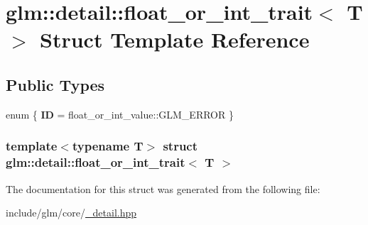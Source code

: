 \hypertarget{structglm_1_1detail_1_1float__or__int__trait}{\section{glm\-:\-:detail\-:\-:float\-\_\-or\-\_\-int\-\_\-trait$<$ \-T $>$ \-Struct \-Template \-Reference}
\label{structglm_1_1detail_1_1float__or__int__trait}
}
\subsection*{\-Public \-Types}
\begin{DoxyCompactItemize}
\item 
enum \{ {\bfseries \-I\-D} =  float\-\_\-or\-\_\-int\-\_\-value\-:\-:\-G\-L\-M\-\_\-\-E\-R\-R\-O\-R
 \}
\end{DoxyCompactItemize}
\subsubsection*{template$<$typename T$>$ struct glm\-::detail\-::float\-\_\-or\-\_\-int\-\_\-trait$<$ T $>$}



\-The documentation for this struct was generated from the following file\-:\begin{DoxyCompactItemize}
\item 
include/glm/core/\hyperlink{__detail_8hpp}{\-\_\-detail.\-hpp}\end{DoxyCompactItemize}
